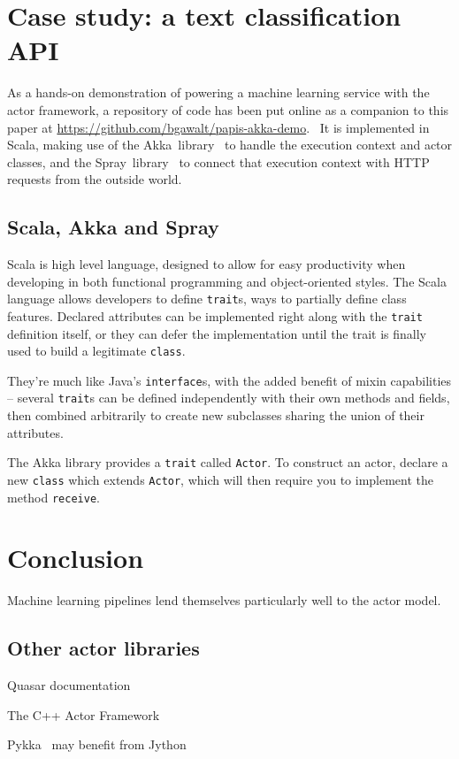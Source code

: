 \documentclass{article}
\begin{document}
\section{Case study: a text classification API}

As a hands-on demonstration of powering a machine learning service with
the actor framework, a repository of code has been put online as a companion 
to this paper at \url{https://github.com/bgawalt/papis-akka-demo}.~\cite{gawalt_papis_demo}
It is implemented in Scala, making use of the Akka~library~\cite{akka_doc}
to handle the execution context and actor classes, and the Spray~library~\cite{spray_doc}
to connect that execution context with HTTP requests from the outside world.

\subsection{Scala, Akka and Spray}

Scala is high level language, designed to allow for easy productivity when
developing in both functional programming and object-oriented styles. The
Scala language allows developers to define \texttt{trait}s, ways to partially 
define class features. Declared attributes can be implemented right
along with the \texttt{trait} definition itself, or they can defer the implementation
until the trait is finally used to build a legitimate \texttt{class}.

They're much like Java's \texttt{interface}s, with the
added benefit of mixin capabilities -- several \texttt{trait}s can be defined
independently with their own methods and fields, then combined arbitrarily 
to create new subclasses sharing the union of their attributes.

The Akka library provides a \texttt{trait} called \texttt{Actor}. To construct
an actor, declare a new \texttt{class} which extends \texttt{Actor}, which
will then require you to implement the method \texttt{receive}.


\section{Conclusion}

Machine learning pipelines lend themselves particularly well to the actor model.

\subsection{Other actor libraries}

Quasar documentation~\cite{quasar_doc}

The C++ Actor Framework~\cite{charousset2014caf}

Pykka~\cite{pykka_doc} may benefit from Jython~\cite{jython}



\end{document}

